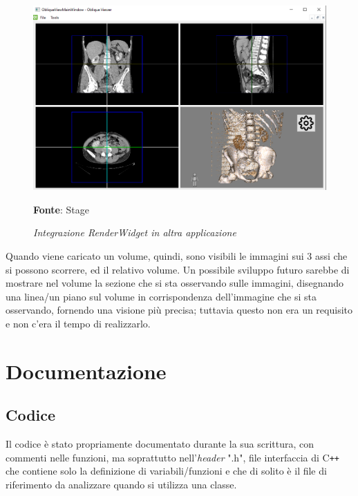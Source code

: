 \begin{figure}[h]
    \centering
    \includegraphics[width=1\textwidth]{immagini/svolgimento/obliqueview.png}
    \caption{\textit{Integrazione RenderWidget in altra applicazione}}
    \textbf{Fonte}: Stage
    \label{fig: Porting RenderWidget}
\end{figure}

Quando viene caricato un volume, quindi, sono visibili le immagini sui 3 assi che si possono scorrere, ed il relativo volume. Un possibile sviluppo futuro sarebbe di mostrare nel volume la sezione che si sta osservando sulle immagini, disegnando una linea/un piano sul volume in corrispondenza dell'immagine che si sta osservando, fornendo una visione più precisa; tuttavia questo non era un requisito e non c'era il tempo di realizzarlo.

\section{Documentazione}
\subsection{Codice}
Il codice è stato propriamente documentato durante la sua scrittura, con commenti nelle funzioni, ma soprattutto nell'\emph{header} ".h", file interfaccia di C\texttt{++} che contiene solo la definizione di variabili/funzioni e che di solito è il file di riferimento da analizzare quando si utilizza una classe.

